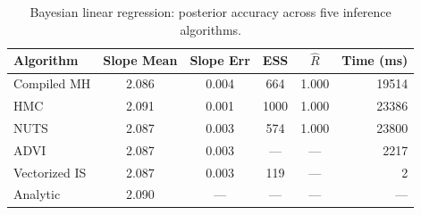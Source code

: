 \begin{table}[t]
\centering
\caption{Bayesian linear regression: posterior accuracy across five inference algorithms.}
\label{tab:linreg}
\begin{tabular}{l c c c c r}
\toprule
Algorithm & Slope Mean & Slope Err & ESS & $\hat{R}$ & Time (ms) \\
\midrule
Compiled MH & 2.086 & 0.004 & 664 & 1.000 & 19514 \\
HMC & 2.091 & 0.001 & 1000 & 1.000 & 23386 \\
NUTS & 2.087 & 0.003 & 574 & 1.000 & 23800 \\
ADVI & 2.087 & 0.003 & --- & --- & 2217 \\
Vectorized IS & 2.087 & 0.003 & 119 & --- & 2 \\
\midrule
Analytic & 2.090 & --- & --- & --- & --- \\
\bottomrule
\end{tabular}
\end{table}
